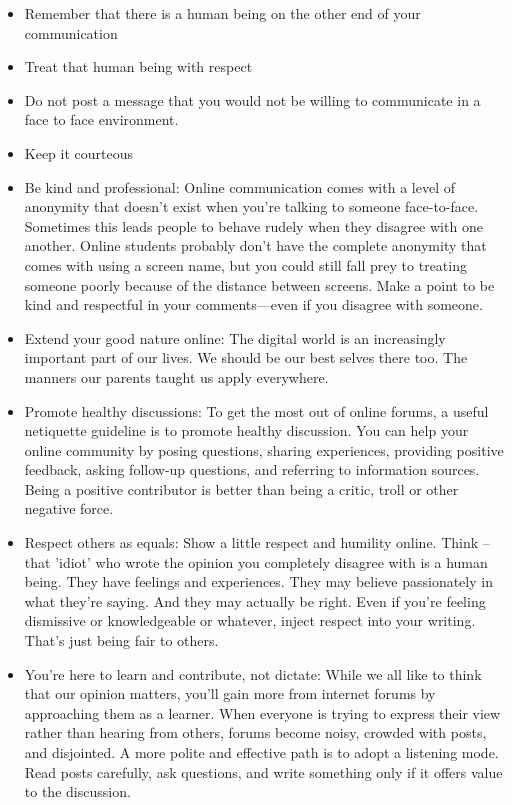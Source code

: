 \documentclass{article}
\begin{document}
 \begin{itemize}
    \item Remember that there is a human being on the other end of your communication
    \item Treat that human being with respect
    \item Do not post a message that you would not be willing to communicate in a face to face environment.
    \item Keep it courteous
    \item Be kind and professional:  Online communication comes with a level of anonymity that doesn’t exist when you’re talking to someone face-to-face. 
    Sometimes this leads people to behave rudely when they disagree with one another. Online students probably don’t have the complete anonymity that comes with using a screen name, but you could still fall prey to treating someone poorly because of the distance between screens. Make a point to be kind and respectful in your comments—even if you disagree with someone.
    \item Extend your good nature online: The digital world is an increasingly important part of our lives. We should be our best selves there too. The manners our parents taught us apply everywhere.
    \item Promote healthy discussions: 
    To get the most out of online forums, a useful netiquette guideline is to promote healthy discussion. You can help your online community by posing questions, sharing experiences, providing positive feedback, asking follow-up questions, and referring to information sources. Being a positive contributor is better than being a critic, troll or other negative force.
    \item  Respect others as equals:
    Show a little respect and humility online. Think – that 'idiot' who wrote the opinion you completely disagree with is a human being. They have feelings and experiences. They may believe passionately in what they're saying. And they may actually be right.
    Even if you're feeling dismissive or knowledgeable or whatever, inject respect into your writing. That's just being fair to others.
    \item You're here to learn and contribute, not dictate: 
    While we all like to think that our opinion matters, you'll gain more from internet forums by approaching them as a learner.
    When everyone is trying to express their view rather than hearing from others, forums become noisy, crowded with posts, and disjointed. 
    A more polite and effective path is to adopt a listening mode. Read posts carefully, ask questions, and write something only if it offers value to the discussion.

\end{itemize}
\end{document}
